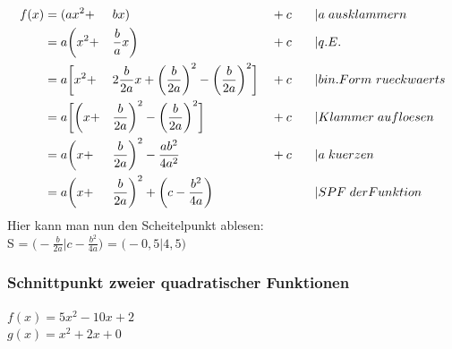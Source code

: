 \documentclass[a4paper]{article} %
\begin{document}
		\begin{alignat*}{4}
		 f(x) 						&=  (ax^{2}    	     + && bx) 										 	   							  &&+c     && \hspace{0.3 cm}|a \hspace{0.1 cm} ausklammern \\
									&= a\bigg( x^{2} 	     + && \frac{b}{a}x \bigg) 						 		   	   							  && +c    && \hspace{0.3 cm}|q.E. \\
									&=  a \bigg[ x^{2}   + && 2\frac{b}{2a}x + \bigg(\frac{b}{2a}\bigg)^2 - \bigg(\frac{b}{2a}\bigg)^2 \bigg]&& +c    && \hspace{0.3 cm}|bin. Form\hspace{0.12 cm} rueckwaerts\\
									&=  a \bigg[\bigg( x + && \frac{b}{2a} \bigg)^{2}  - \bigg(\frac{b}{2a}\bigg)^2 \bigg]				  && +c    && \hspace{0.3 cm}|Klammer\hspace{0.1 cm} aufloesen\\
									&=  a \bigg( x       + && \frac{b}{2a} \bigg)^{2}  - \frac{ab^{2}}{4a^{2}} 							  && +c    && \hspace{0.3 cm}|a \hspace{0.1 cm} kuerzen \\ %
									&=  a \bigg( x       + && \frac{b}{2a} \bigg)^{2}  +\bigg( c - \frac{b^{2}}{4a}\bigg) 				  &&       && \hspace{0.3 cm} |SPF \hspace{0.1 cm} der Funktion \\
		\end{alignat*}
		\hspace{-0.1 cm}
		Hier kann man nun den Scheitelpunkt ablesen: \\

		S =   $\bigg( -\frac{b}{2a}  | c - \frac{b^{2}}{4a}\bigg)$ =  $\bigg( -0,5  | 4,5\bigg)$
		\subsubsection{Schnittpunkt zweier quadratischer Funktionen}
		$f(x)=5x^2-10x+2$\\
		$g(x)=x^2+2x+0$
\end{document}
